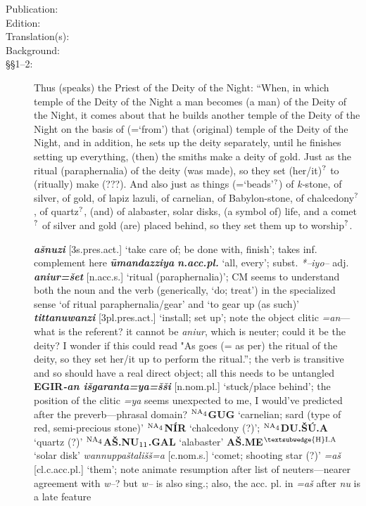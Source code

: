 \documentclass[10pt]{article}
\newcommand{\supersc}[1]{$^{\textrm{\scriptsize{#1}}}$}  	%
\newcommand{\subsc}[1]{$_{\textrm{\scriptsize{#1}}}$}	%
\newcommand{\bit}[1]{\textbf{\textit{#1}}}				%
\newcommand{\p}[1]{{\tiny[{#1}]}}					%
\newcommand{\hith}{\textsubwedge{h}}
\newcommand{\Hith}{\textsubwedge{H}}
\newcommand{\hpl}{\supersc{{\Hith}I.A}}
\newcommand{\stone}{\supersc{NA\subsc{4}}}
\renewcommand{\.}[1]{\textsubdot{#1}}
\begin{document}
\begin{description}

\item[Publication:] 
\item[Edition:]  %
\item[Translation(s):] 
\item[Background:] 

\item[\S\S1--2:] Thus (speaks) the Priest of the Deity of the Night: ``When, in which temple of the Deity of the Night a man becomes (a man) of the Deity of the Night, it comes about that he builds another temple of the Deity of the Night on the basis of (=`from') that (original) temple of the Deity of the Night, and in addition, he sets up the deity separately, until he finishes setting up everything, (then) the smiths make a deity of gold. Just as the ritual (paraphernalia) of the deity (was made), so they set (her/it)\supersc{?} to (ritually) make (???). And also just as things (=`beads'\supersc{?}) of \textit{k-}stone, of silver, of gold, of lapiz lazuli, of carnelian, of Babylon-stone, of chalcedony\supersc{?}, of quartz\supersc{?}, (and) of alabaster, solar disks, (a symbol of) life, and a comet\supersc{?} of silver and gold (are) placed behind, so they set them up to worship\supersc{?}. 

\begin{notes}

\bit{a\v{s}nuzi} \p{3s.pres.act.} `take care of; be done with, finish'; takes inf. complement here \bit{{\hith}\=umandazziya} \bit{n.acc.pl.} `all, every'; subst. \textit{*--iyo--} adj. \bit{aniur=\v{s}et} \p{n.acc.s.} `ritual (paraphernalia)'; CM seems to understand both the noun and the verb (generically, `do; treat') in the specialized sense `of ritual paraphernalia/gear' and `to gear up (as such)' \bit{tittanuwanzi} \p{3pl.pres.act.} `install; set up'; note the object clitic \textit{=an}---what is the referent? it cannot be \textit{aniur}, which is neuter; could it be the deity? I wonder if this could read "As goes (= as per) the ritual of the deity, so they set her/it up to perform the ritual.''; the verb is transitive and so should have a real direct object; all this needs to be untangled \textbf{EGIR}\bit{-an i\v{s}garanta=ya=\v{s}\v{s}i} \p{n.nom.pl.} `stuck/place behind'; the position of the clitic \textit{=ya} seems unexpected to me, I would've predicted after the preverb---phrasal domain? \textbf{{\stone}GUG} `carnelian; sard (type of red, semi-precious stone)' \textbf{{\stone}N\'IR} `chalcedony (?)'; \textbf{{\stone}DU{\Hith}.\v{S}\'U.A} `quartz (?)' \textbf{{\stone}A\v{S}.NU\subsc{11}.GAL} `alabaster' \textbf{A\v{S}.ME{\hpl}} `solar disk' \textit{wannuppa\v{s}tali\v{s}\v{s}=a} \p{c.nom.s.} `comet; shooting star (?)' \textit{=a\v{s}} \p{cl.c.acc.pl.} `them'; note animate resumption after list of neuters---nearer agreement with \textit{w--}? but \textit{w--} is also sing.; also, the acc. pl. in \textit{=a\v{s}} after \textit{nu} is a late feature



\end{notes}
\end{description}
\end{document}
